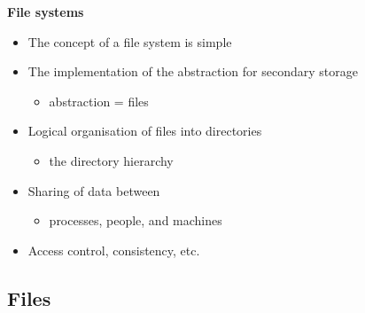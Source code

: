 \documentclass[11pt,a4paper]{article}
\begin{document}
\textbf{File systems}
\begin{itemize}
    \item The concept of a file system is simple
    \item The implementation of the abstraction for secondary storage
        \begin{itemize}
            \item abstraction = files
        \end{itemize}
    \item Logical organisation of files into directories
        \begin{itemize}
            \item the directory hierarchy
        \end{itemize}
    \item Sharing of data between
        \begin{itemize}
            \item processes, people, and machines
        \end{itemize}
    \item Access control, consistency, etc.
\end{itemize}

\subsection{Files}
\end{document}
